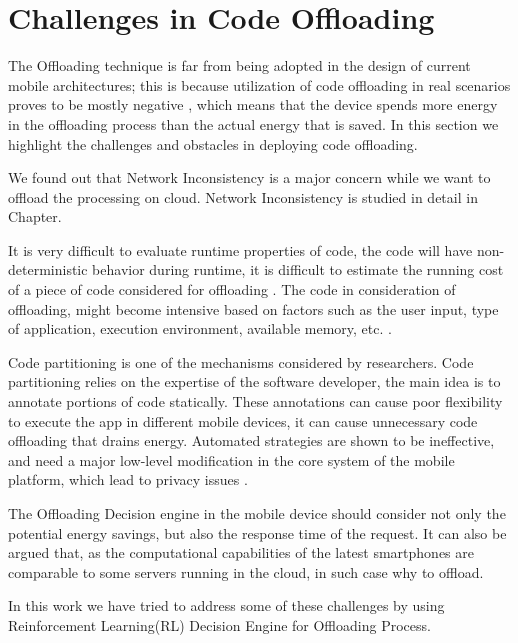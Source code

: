 \documentclass{report}
\begin{document}
\section{Challenges in Code Offloading}

The Offloading technique is far from being adopted in the design of current mobile architectures; this is because utilization of code offloading in real scenarios proves to be mostly negative \cite{flores2013mobile}, which means that the device spends
more energy in the offloading process than the actual energy that is saved. In this section we highlight the challenges and obstacles in deploying code offloading.

We found out that Network Inconsistency is a major concern while we want to offload the processing on cloud. Network Inconsistency is studied in detail in Chapter.

It is very difficult to evaluate runtime properties of code, the code will have non-deterministic behavior during runtime, it is difficult to estimate the running cost of a piece of code considered for offloading \cite{flores2015mobile}. The code in consideration of offloading, might become intensive based on factors such as the user input, type of application, execution environment, available memory, etc. \cite{flores2013mobile}.

Code partitioning is one of the mechanisms considered by researchers. Code partitioning relies on the expertise of the software developer, the main idea is to annotate portions of code statically. These annotations can cause poor flexibility to execute the app in different mobile devices, it can cause unnecessary code offloading that drains energy. Automated strategies are shown to be ineffective, and need a major low-level modification in the core system of the mobile platform, which lead to privacy issues \cite{flores2015mobile}.

The Offloading Decision engine in the mobile device should consider not only the potential energy savings, but also the response time of the request. It can also be argued that, as the computational capabilities of the latest smartphones are comparable to some servers running in the cloud, in such case why to offload.

In this work we have tried to address some of these challenges by using Reinforcement Learning(RL) Decision Engine for Offloading Process.
\end{document}
